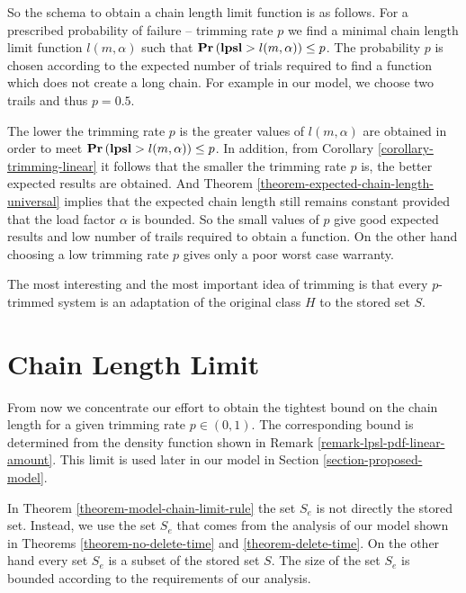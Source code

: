 So the schema to obtain a chain length limit function is as follows. For a prescribed probability of failure -- trimming rate $p$ we find a minimal chain length limit function $l(m, \alpha)$ such that $\mathbf{Pr}\left(\mathbf{lpsl} > l(m, \alpha)\right) \leq p$. The probability $p$ is chosen according to the expected number of trials required to find a function which does not create a long chain. For example in our model, we choose two trails and thus $p = 0.5$.

The lower the trimming rate $p$ is the greater values of $l(m, \alpha)$ are obtained in order to meet $\mathbf{Pr}\left(\mathbf{lpsl} > l(m, \alpha)\right) \leq p$. In addition, from Corollary \ref{corollary-trimming-linear} it follows that the smaller the trimming rate $p$ is, the better expected results are obtained. And Theorem \ref{theorem-expected-chain-length-universal} implies that the expected chain length still remains constant provided that the load factor $\alpha$ is bounded. So the small values of $p$ give good expected results and low number of trails required to obtain a function. On the other hand choosing a low trimming rate $p$ gives only a poor worst case warranty.

The most interesting and the most important idea of trimming is that every $p$-trimmed system is an adaptation of the original class $H$ to the stored set $S$.

\section{Chain Length Limit}
\label{section-linear-systems-linear-amount-constant-estimate}
From now we concentrate our effort to obtain the tightest bound on the chain length for a given trimming rate $p \in (0, 1)$. The corresponding bound is determined from the density function shown in Remark \ref{remark-lpsl-pdf-linear-amount}. This limit is used later in our model in Section \ref{section-proposed-model}.

In Theorem \ref{theorem-model-chain-limit-rule} the set $S_e$ is not directly the stored set. Instead, we use the set $S_e$ that comes from the analysis of our model shown in Theorems \ref{theorem-no-delete-time} and \ref{theorem-delete-time}. On the other hand every set $S_e$ is a subset of the stored set $S$. The size of the set $S_e$ is bounded according to the requirements of our analysis.


